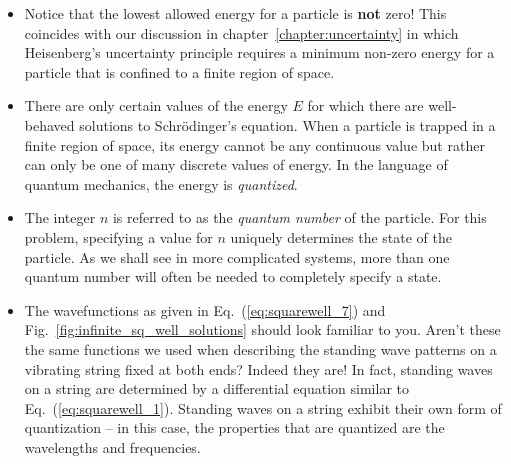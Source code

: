 \begin{itemize} 
\item Notice that the lowest allowed energy for a particle is {\bf
  not} zero!  This coincides with our discussion in
  chapter~\ref{chapter:uncertainty} in which Heisenberg's uncertainty
  principle requires a minimum non-zero energy for a particle that is
  confined to a finite region of space.

\item There are only certain values of the energy $E$ for which there are
  well-behaved solutions to Schr\"odinger's equation. When a particle is trapped 
  in a finite region of space, its energy cannot be any continuous value
  but rather can only be one of many discrete values of energy. In the
  language of quantum mechanics, the energy is {\it quantized}.

\item The integer $n$ is referred to as the {\it quantum number} of
  the particle. For this problem, specifying a value for $n$ uniquely 
  determines the state of the particle.  As we shall see in more
  complicated systems, more than one quantum number will often be needed 
  to completely specify a state.

\item The wavefunctions as given in Eq.~(\ref{eq:squarewell_7})
  and Fig.~\ref{fig:infinite_sq_well_solutions} should look
  familiar to you.  Aren't these the same functions we used when
  describing the standing wave patterns on a vibrating string fixed at
  both ends?  Indeed they are! In fact, standing waves on a string are
  determined by a differential equation similar to Eq.~(\ref{eq:squarewell_1}).
  Standing waves on a string exhibit their own form of quantization --
  in this case, the properties that are quantized are the wavelengths
  and frequencies.

\end{itemize}

